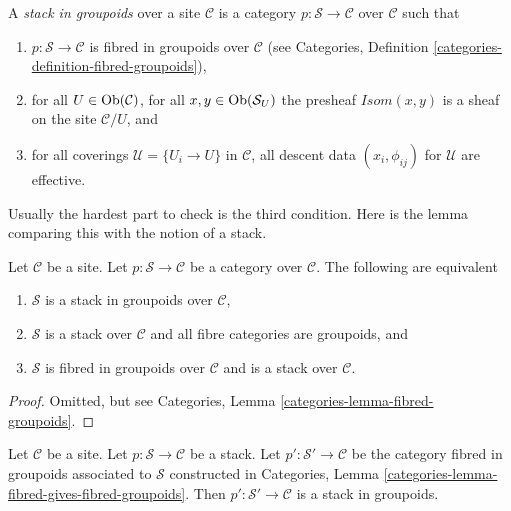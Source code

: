 \begin{definition}
\label{definition-stack-in-groupoids}
A {\it stack in groupoids} over a site $\mathcal{C}$ is a
category $p : \mathcal{S} \to \mathcal{C}$ over $\mathcal{C}$
such that
\begin{enumerate}
\item $p : \mathcal{S} \to \mathcal{C}$ is fibred
in groupoids over $\mathcal{C}$ (see
Categories, Definition \ref{categories-definition-fibred-groupoids}),
\item for all $U \in \mathop{\mathrm{Ob}}\nolimits(\mathcal{C})$,
for all $x, y\in \mathop{\mathrm{Ob}}\nolimits(\mathcal{S}_U)$ the presheaf
$\mathit{Isom}(x, y)$ is a sheaf on the site $\mathcal{C}/U$, and
\item for all coverings $\mathcal{U} = \{U_i \to U\}$ in $\mathcal{C}$,
all descent data $(x_i, \phi_{ij})$ for $\mathcal{U}$ are effective.
\end{enumerate}
\end{definition}

\noindent
Usually the hardest part to check is the third condition.
Here is the lemma comparing this with the notion of a stack.

\begin{lemma}
\label{lemma-stack-in-groupoids-stack}
Let $\mathcal{C}$ be a site.
Let $p : \mathcal{S} \to \mathcal{C}$ be a category over $\mathcal{C}$.
The following are equivalent
\begin{enumerate}
\item $\mathcal{S}$ is a stack in groupoids over $\mathcal{C}$,
\item $\mathcal{S}$ is a stack over $\mathcal{C}$ and all
fibre categories are groupoids, and
\item $\mathcal{S}$ is fibred in groupoids over $\mathcal{C}$
and is a stack over $\mathcal{C}$.
\end{enumerate}
\end{lemma}

\begin{proof}
Omitted, but see Categories, Lemma \ref{categories-lemma-fibred-groupoids}.
\end{proof}

\begin{lemma}
\label{lemma-stack-gives-stack-groupoids}
Let $\mathcal{C}$ be a site.
Let $p : \mathcal{S} \to \mathcal{C}$ be a stack.
Let $p' : \mathcal{S}' \to \mathcal{C}$
be the category fibred in groupoids associated to $\mathcal{S}$
constructed in
Categories, Lemma \ref{categories-lemma-fibred-gives-fibred-groupoids}.
Then $p' : \mathcal{S}' \to \mathcal{C}$ is a stack in groupoids.
\end{lemma}

